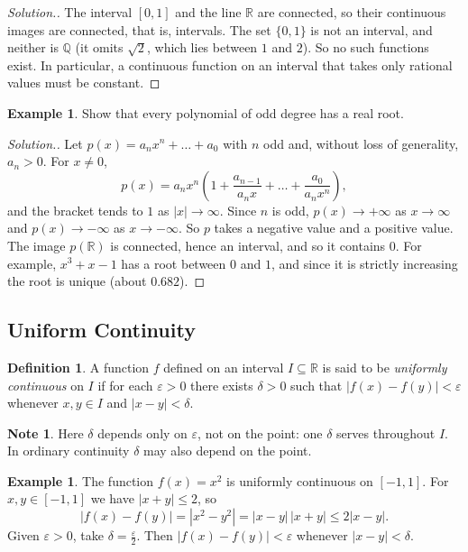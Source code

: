 \documentclass[11pt,a4paper]{article}
\numberwithin{equation}{section}
\theoremstyle{definition}
\newtheorem{defn}[thm]{Definition}
\newtheorem{exa}[thm]{Example}
\newtheorem*{note}{Note}
\newenvironment{solution}
  {\renewcommand{\qedsymbol}{}\begin{proof}[\textit{Solution}.]}
  {\end{proof}}
\begin{document}
\begin{solution}
The interval $[0,1]$ and the line $\mathbb{R}$ are connected, so their continuous images are connected, that is, intervals. The set $\{0,1\}$ is not an interval, and neither is $\mathbb{Q}$ (it omits $\sqrt{2}$, which lies between $1$ and $2$). So no such functions exist. In particular, a continuous function on an interval that takes only rational values must be constant.
\end{solution}

\begin{exa}
Show that every polynomial of odd degree has a real root.
\end{exa}

\begin{solution}
Let $p(x) = a_nx^n + \dots + a_0$ with $n$ odd and, without loss of generality, $a_n>0$. For $x\neq0$,
$$p(x) = a_nx^n\left(1 + \frac{a_{n-1}}{a_nx} + \dots + \frac{a_0}{a_nx^n}\right),$$
and the bracket tends to $1$ as $|x|\longrightarrow\infty$. Since $n$ is odd, $p(x)\longrightarrow+\infty$ as $x\longrightarrow\infty$ and $p(x)\longrightarrow-\infty$ as $x\longrightarrow-\infty$. So $p$ takes a negative value and a positive value. The image $p(\mathbb{R})$ is connected, hence an interval, and so it contains $0$. For example, $x^3+x-1$ has a root between $0$ and $1$, and since it is strictly increasing the root is unique (about $0.682$).
\end{solution}


\subsection{Uniform Continuity}

\begin{defn}
A function $f$ defined on an interval $I\subseteq \mathbb{R}$ is said to be \emph{uniformly continuous} on $I$ if for each $\varepsilon > 0$ there exists $\delta > 0$ such that $|f(x) - f(y)| < \varepsilon$ whenever $x, y\in I$ and $|x - y| < \delta$.
\end{defn}

\begin{note}
Here $\delta$ depends only on $\varepsilon$, not on the point: one $\delta$ serves throughout $I$. In ordinary continuity $\delta$ may also depend on the point.
\end{note}


\begin{exa}
The function $f(x) = x^2$ is uniformly continuous on $[-1,1]$. For $x, y\in [-1,1]$ we have $|x+y|\leq 2$, so
$$|f(x) - f(y)| = |x^2 - y^2|= |x - y|\,|x + y|\leq 2|x - y| .$$
Given $\varepsilon > 0$, take $\delta = \frac{\varepsilon}{2}$. Then $|f(x) - f(y)| < \varepsilon$ whenever $|x - y| < \delta$.
\end{exa}
\end{document}
